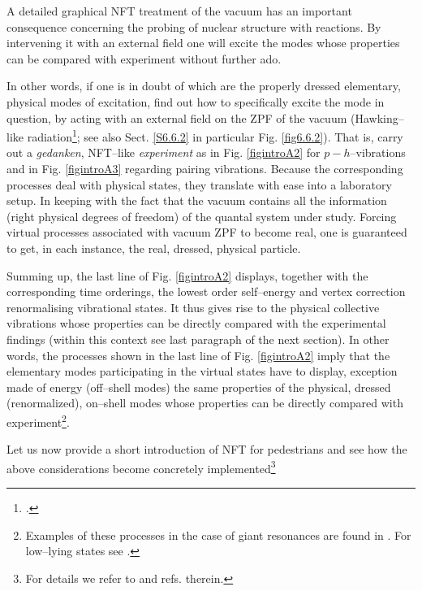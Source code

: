 A detailed graphical NFT treatment of the vacuum has an important consequence concerning the probing of nuclear structure with reactions. By intervening it with an external field one will excite the modes whose properties can be  compared with experiment without further ado. 

In other words, if one is in doubt of which are the properly dressed elementary, physical modes of excitation, find out how to specifically excite the  mode in question, by acting with an external field on the ZPF of the vacuum (Hawking--like radiation\footnote{\cite{Barranco:17b}.}; see also Sect. \ref{S6.6.2} in particular Fig. \ref{fig6.6.2}). That is,  carry out a \textit{gedanken}, NFT--like \textit{experiment} as in Fig. \ref{figintroA2} for $p-h$--vibrations and in Fig. \ref{figintroA3} regarding pairing vibrations. Because the corresponding processes deal  with physical states, they translate with ease into a laboratory setup. In keeping with the fact that the vacuum contains all the information (right physical degrees of freedom) of the quantal system under study. Forcing virtual processes associated  with vacuum ZPF to become real, one is guaranteed to get, in each instance, the real, dressed, physical particle. 

Summing up, the last line of Fig. \ref{figintroA2} displays, together with the corresponding time orderings, the lowest order self--energy and vertex correction renormalising vibrational states. It thus gives rise to the physical collective vibrations whose properties can be directly compared with the experimental findings (within this context see last paragraph of the next section). In other words, the processes shown in the last line of   Fig. \ref{figintroA2} imply that the elementary modes participating in the virtual states have to display, exception made of energy (off--shell modes) the same properties of the physical, dressed (renormalized), on--shell modes whose properties can be directly compared with experiment\footnote{Examples of these processes in the case of giant resonances are found in \cite{Bortignon:81,Bertsch:83}. For low--lying states see \cite{Barranco:04}.}.


Let us now provide a short introduction of NFT for pedestrians and see how the above considerations become concretely implemented\footnote{For details we refer to \cite{Bortignon:77} and refs. therein.}
